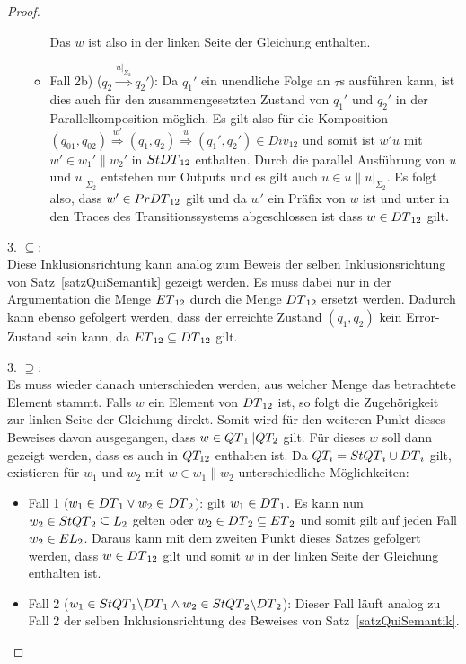 \begin{proof}
\begin{itemize}
\begin{itemize}
          Das $w$ ist also in der linken Seite der Gleichung enthalten.
        \item Fall 2b) ($q_2 \overset{u|_{\Sigma _2}}{\Rightarrow} q_2'$): Da
          $q_1'$ ein unendliche Folge an $\tau$s ausführen kann, ist dies auch
          für den zusammengesetzten Zustand von $q_1'$ und $q_2'$ in der
          Parallelkomposition möglich. Es gilt also für die Komposition
          $(q_{01},q_{02}) \overset{w'}{\Rightarrow} (q_1,q_2)
          \overset{u}{\Rightarrow} (q_1',q_2')\in Div_{12}$ und somit ist $w'u$
          mit $w'\in w_1'\|w_2'$ in $StDT{}_{12}$ enthalten. Durch die
          parallel Ausführung von $u$ und $u|_{\Sigma _2}$ entstehen nur
          Outputs und es gilt auch $u\in u\|u|_{\Sigma _2}$. Es folgt also,
          dass $w'\in PrDT{}_{12}$ gilt und da $w'$ ein Präfix von $w$ ist und
          \DT{} unter \cont{} in den \EL{} Traces des Transitionssystems
          abgeschlossen ist dass $w\in DT{}_{12}$ gilt.
      \end{itemize}
  \end{itemize}

  3. \glqq{}$\subseteq$\grqq{}:\\
  Diese Inklusionsrichtung kann analog zum Beweis der selben Inklusionsrichtung
  von Satz~\ref{satzQuiSemantik} gezeigt werden. Es muss dabei nur in der
  Argumentation die Menge $ET{}_{12}$ durch die Menge $DT{}_{12}$ ersetzt
  werden. Dadurch kann ebenso gefolgert werden, dass der erreichte Zustand
  $(q_1,q_2)$ kein Error-Zustand sein kann, da $ET{}_{12}\subseteq DT{}_{12}$
  gilt.

  3. \glqq{}$\supseteq$\grqq{}:\\
  Es muss wieder danach unterschieden werden, aus welcher Menge das betrachtete
  Element stammt. Falls $w$ ein Element von $DT{}_{12}$ ist, so folgt die
  Zugehörigkeit zur linken Seite der Gleichung direkt. Somit wird für den
  weiteren Punkt dieses Beweises davon ausgegangen, dass $w\in QT{}_1\|QT_2$
  gilt. Für dieses $w$ soll dann gezeigt werden, dass es auch in $QT_{12}$
  enthalten ist. Da $QT_i=StQT{}_i\cup DT{}_i$ gilt, existieren für $w_1$
  und $w_2$ mit $w\in w_1\|w_2$ unterschiedliche Möglichkeiten:
  \begin{itemize}
    \item Fall 1 ($w_1\in DT{}_1 \vee w_2\in DT{}_2$): \OBdA{} gilt $w_1\in
      DT{}_1$. Es kann nun $w_2\in StQT{}_2 \subseteq L_2$ gelten oder
      $w_2\in DT{}_2\subseteq ET{}_2$ und somit gilt auf jeden Fall $w_2\in
      EL{}_2$. Daraus kann mit dem zweiten Punkt dieses Satzes gefolgert
      werden, dass $w\in DT{}_{12}$ gilt und somit $w$ in der linken Seite der
      Gleichung enthalten ist.
    \item Fall 2 ($w_1\in StQT{}_1\backslash DT{}_1 \wedge w_2\in StQT{}_2
      \backslash DT{}_2$): Dieser Fall läuft analog zu Fall 2 der selben
      Inklusionsrichtung des Beweises von Satz~\ref{satzQuiSemantik}.
  \end{itemize}
\end{proof}


